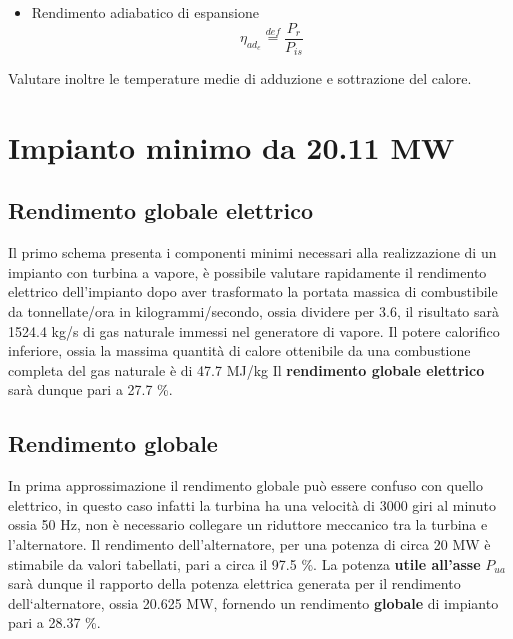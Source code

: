 \documentclass[a4paper,12pt]{article}
\begin{document}
\begin{itemize}
   \item Rendimento adiabatico di espansione
   \begin{equation}
        \label{eq:rendimento_adiabatico}
        \eta_{ad_e} \stackrel{def}{=} \frac{P_r}{P_{is}}
    \end{equation}
\end{itemize}
Valutare inoltre le temperature medie di adduzione e sottrazione del calore.

\section{Impianto minimo da 20.11 MW}
\label{sec:primo_impianto}
\subsection{Rendimento globale elettrico}
\label{subsec:rendimento_globale_elettrico}
Il primo schema presenta i componenti minimi necessari alla realizzazione di un impianto con turbina a vapore,
è possibile valutare rapidamente il rendimento elettrico dell'impianto dopo aver trasformato la portata massica di combustibile da 
tonnellate/ora in kilogrammi/secondo, ossia dividere per 3.6, il risultato sarà 1524.4 kg/s di gas naturale immessi nel generatore di vapore.
Il potere calorifico inferiore, ossia la massima quantità di calore ottenibile da una combustione completa del gas naturale è di 47.7 MJ/kg
Il \textbf{rendimento globale elettrico} sarà dunque pari a 27.7 \%.

\subsection{Rendimento globale}
\label{subsec:rendimento_globale}
In prima approssimazione il rendimento globale può essere confuso con quello elettrico, in questo caso infatti la turbina ha una velocità
di 3000 giri al minuto ossia 50 Hz, non è necessario collegare un riduttore meccanico tra la turbina e l'alternatore.
Il rendimento dell'alternatore, per una potenza di circa 20 MW è stimabile da valori tabellati, pari a circa il 97.5 \%.
La potenza \textbf{utile all'asse} $P_{ua}$ sarà dunque il rapporto della potenza elettrica generata per il rendimento dell`alternatore, ossia
20.625 MW, fornendo un rendimento \textbf{globale} di impianto pari a 28.37 \%. 
\end{document}
